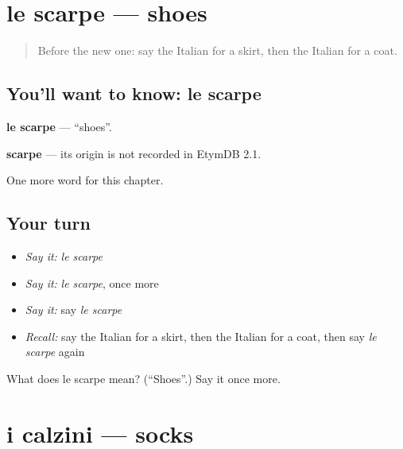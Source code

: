 \section[le scarpe]{le scarpe — shoes}

\label{lesson:IT-C104-scarpe}



\begin{quote}
Before the new one: say the Italian for a skirt, then the Italian for a coat.
\end{quote}

\subsection*{You'll want to know: le scarpe}
\textbf{le scarpe} — \textquotedblleft{}shoes\textquotedblright{}.

\begin{cousinweb}
\textbf{scarpe} — its origin is not recorded in EtymDB 2.1.
\end{cousinweb}

\begin{grammarlens}[title={What you've built}]
One more word for this chapter.
\end{grammarlens}

\subsection*{Your turn}
\begin{itemize}
\raggedright
  \item \emph{Say it:} \emph{le scarpe}
  \item \emph{Say it:} \emph{le scarpe}, once more
  \item \emph{Say it:} say \emph{le scarpe}
  \item \emph{Recall:} say the Italian for a skirt, then the Italian for a coat, then say \emph{le scarpe} again
\end{itemize}

\begin{tcolorbox}[breakable,colback=teal!4,colframe=teal!35!black,title={Before you move on}]
What does le scarpe mean? (\textquotedblleft{}Shoes\textquotedblright{}.) Say it once more.
\end{tcolorbox}
\section[i calzini]{i calzini — socks}

